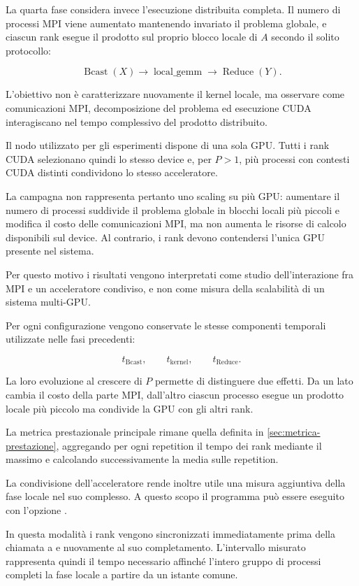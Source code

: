La quarta fase considera invece l'esecuzione distribuita completa. Il
numero di processi MPI viene aumentato mantenendo invariato il problema
globale, e ciascun rank esegue il prodotto sul proprio blocco locale di
$A$ secondo il solito protocollo:

\[
\operatorname{Bcast}(X)
\longrightarrow
\operatorname{local\_gemm}
\longrightarrow
\operatorname{Reduce}(Y).
\]

L'obiettivo non è caratterizzare nuovamente il kernel locale, ma osservare
come comunicazioni MPI, decomposizione del problema ed esecuzione CUDA
interagiscano nel tempo complessivo del prodotto distribuito.

Il nodo utilizzato per gli esperimenti dispone di una sola GPU. Tutti i
rank CUDA selezionano quindi lo stesso device e, per $P>1$, più processi
con contesti CUDA distinti condividono lo stesso acceleratore.

La campagna non rappresenta pertanto uno scaling su più GPU: aumentare il
numero di processi suddivide il problema globale in blocchi locali più
piccoli e modifica il costo delle comunicazioni MPI, ma non aumenta le
risorse di calcolo disponibili sul device. Al contrario, i rank devono
contendersi l'unica GPU presente nel sistema.

Per questo motivo i risultati vengono interpretati come studio
dell'interazione fra MPI e un acceleratore condiviso, e non come misura
della scalabilità di un sistema multi-GPU.

Per ogni configurazione vengono conservate le stesse componenti temporali
utilizzate nelle fasi precedenti:

\[
t_{\mathrm{Bcast}},
\qquad
t_{\mathrm{kernel}},
\qquad
t_{\mathrm{Reduce}}.
\]

La loro evoluzione al crescere di $P$ permette di distinguere due effetti.
Da un lato cambia il costo della parte MPI, dall'altro ciascun processo
esegue un prodotto locale più piccolo ma condivide la GPU con gli altri
rank.

La metrica prestazionale principale rimane quella definita in
\cref{sec:metrica-prestazione}, aggregando per ogni repetition il tempo
dei rank mediante il massimo e calcolando successivamente la media sulle
repetition.

La condivisione dell'acceleratore rende inoltre utile una misura aggiuntiva
della fase locale nel suo complesso. A questo scopo il programma può essere
eseguito con l'opzione .

In questa modalità i rank vengono sincronizzati immediatamente prima della
chiamata a  e nuovamente al suo completamento. L'intervallo
misurato rappresenta quindi il tempo necessario affinché l'intero gruppo
di processi completi la fase locale a partire da un istante comune.

